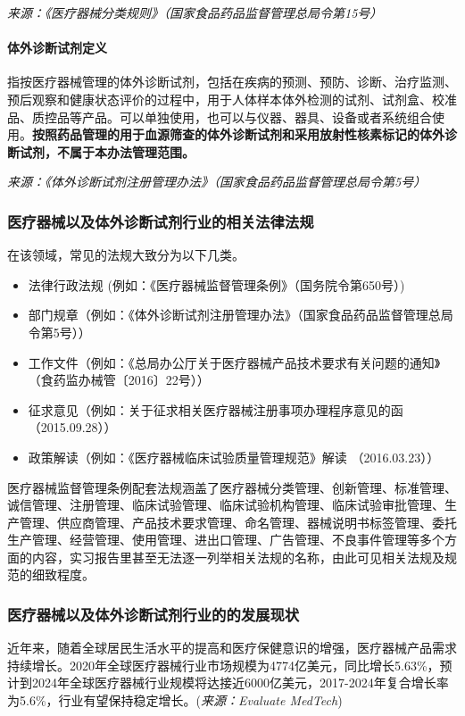 \textit{来源：《医疗器械分类规则》（国家食品药品监督管理总局令第15号）}


\paragraph{体外诊断试剂定义}
指按医疗器械管理的体外诊断试剂，包括在疾病的预测、预防、诊断、治疗监测、预后观察和健康状态评价的过程中，用于人体样本体外检测的试剂、试剂盒、校准品、质控品等产品。可以单独使用，也可以与仪器、器具、设备或者系统组合使用。\textbf{按照药品管理的用于血源筛查的体外诊断试剂和采用放射性核素标记的体外诊断试剂，不属于本办法管理范围。}

\textit{来源：《体外诊断试剂注册管理办法》（国家食品药品监督管理总局令第5号）}



\subsubsection{医疗器械以及体外诊断试剂行业的相关法律法规}
在该领域，常见的法规大致分为以下几类。
\begin{itemize}
    \item 法律行政法规 (例如：《医疗器械监督管理条例》（国务院令第650号）)
    \item 部门规章（例如：《体外诊断试剂注册管理办法》（国家食品药品监督管理总局令第5号））
    \item 工作文件（例如：《总局办公厅关于医疗器械产品技术要求有关问题的通知》（食药监办械管〔2016〕22号））
    \item 征求意见（例如：关于征求相关医疗器械注册事项办理程序意见的函（2015.09.28））
    \item 政策解读（例如：《医疗器械临床试验质量管理规范》解读 （2016.03.23））
\end{itemize}

医疗器械监督管理条例配套法规涵盖了医疗器械分类管理、创新管理、标准管理、诚信管理、注册管理、临床试验管理、临床试验机构管理、临床试验审批管理、生产管理、供应商管理、产品技术要求管理、命名管理、器械说明书标签管理、委托生产管理、经营管理、使用管理、进出口管理、广告管理、不良事件管理等多个方面的内容，实习报告里甚至无法逐一列举相关法规的名称，由此可见相关法规及规范的细致程度。

\subsubsection{医疗器械以及体外诊断试剂行业的的发展现状}
近年来，随着全球居民生活水平的提高和医疗保健意识的增强，医疗器械产品需求持续增长。2020年全球医疗器械行业市场规模为4774亿美元，同比增长5.63\%，预计到2024年全球医疗器械行业规模将达接近6000亿美元，2017-2024年复合增长率为5.6\%，行业有望保持稳定增长。(\textit{来源：Evaluate MedTech})

